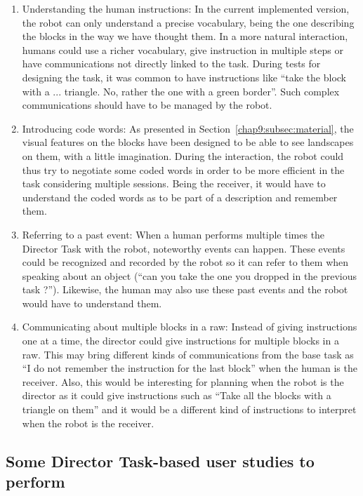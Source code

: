 \documentclass[a4paper,11pt,twoside]{StyleThese}
\begin{document}
\begin{enumerate}[leftmargin=* ,parsep=0cm,itemsep=0cm,topsep=0cm]
	\item Understanding the human instructions: In the current implemented version, the robot can only understand a precise vocabulary, being the one describing the blocks in the way we have thought them. In a more natural interaction, humans could use a richer vocabulary, give instruction in multiple steps or have communications not directly linked to the task. During tests for designing the task, it was common to have instructions like ``take the block with a ... triangle. No, rather the one with a green border''. Such complex communications should have to be managed by the robot. \label{chal:understand}
	\item Introducing code words: As presented in Section~\ref{chap9:subsec:material}, the visual features on the blocks have been designed to be able to see landscapes on them, with a little imagination. During the interaction, the robot could thus try to negotiate some coded words in order to be more efficient in the task considering multiple sessions. Being the receiver, it would have to understand the coded words as to be part of a description and remember them. \label{chal:words}
	\item Referring to a past event: When a human performs multiple times the Director Task with the robot, noteworthy events can happen. These events could be recognized and recorded by the robot so it can refer to them when speaking about an object (\eg ``can you take the one you dropped in the previous task ?''). Likewise, the human may also use these past events and the robot would have to understand them. \label{chal:past}
	\item Communicating about multiple blocks in a raw: Instead of giving instructions one at a time, the director could give instructions for multiple blocks in a raw. This may bring different kinds of communications from the base task as ``I do not remember the instruction for the last block'' when the human is the receiver. Also, this would be interesting for planning when the robot is the director as it could give instructions such as ``Take all the blocks with a triangle on them'' and it would be a different kind of instructions to interpret when the robot is the receiver.
	\label{chal:multi}
\end{enumerate}


\subsection{Some Director Task-based user studies to perform}
\end{document}
